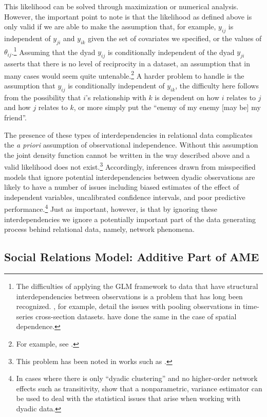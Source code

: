 This likelihood can be solved through maximization or numerical analysis. However, the important point to note is that the likelihood as defined above is only valid if we are able to make the assumption that, for example, $y_{ij}$ is independent of $y_{ji}$ and $y_{ik}$ given the set of covariates we specified, or the values of $\theta_{ij}$.\footnote{The difficulties of applying the GLM framework to data that have structural interdependencies between observations is a problem that has long been recognized. \citet{beck:katz:1995}, for example, detail the issues with pooling observations in time-series cross-section datasets. \citet{ward:gleditsch:2008} have done the same in the case of spatial dependence.} Assuming that the dyad $y_{ij}$ is conditionally independent of the dyad $y_{ji}$ asserts that there is no level of reciprocity in a dataset, an assumption that in many cases would seem quite untenable.\footnote{For example, see \citet{ward:etal:2007,cranmer:2014,dorff:minhas:2016}.} A harder problem to handle is the assumption that $y_{ij}$ is conditionally independent of $y_{ik}$, the difficulty here follows from the possibility that $i$'s relationship with $k$ is dependent on how $i$ relates to $j$ and how $j$ relates to $k$, or more simply put the ``enemy of my enemy [may be] my friend''. 

The presence of these types of interdependencies in relational data complicates the \textit{a priori} assumption of observational independence. Without this assumption the joint density function cannot be written in the way described above and  a valid likelihood does not exist.\footnote{This problem has been noted in works such as \citet{lai:1995,manger:etal:2012,kinne:2013}.} Accordingly, inferences drawn from misspecified models that ignore potential interdependencies between dyadic observations are likely to have a number of issues including biased estimates of the effect of independent variables, uncalibrated confidence intervals, and poor predictive performance.\footnote{In cases where there is only ``dyadic clustering'' and no higher-order network effects such as transitivity, \citet{aronow:etal:2015} show that a nonparametric, variance estimator can be used to deal with the statistical issues that arise when working with dyadic data.} Just as important, however, is that by ignoring these interdependencies we ignore a potentially important part of the data generating process behind relational data, namely, network phenomena. 

\subsection{Social Relations Model: Additive Part of AME}

